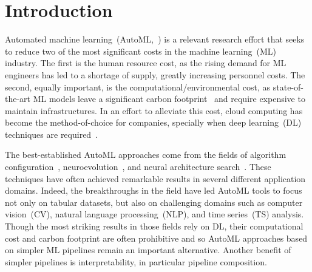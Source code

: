 
\section{Introduction}
\label{sec:intro}

Automated machine learning~(AutoML,~\cite{HutKotVan2019automl}) is a relevant research effort that seeks to reduce two of the most significant costs in the machine learning~(ML) industry. The first is the human resource cost, as the rising demand for ML engineers has led to a shortage of supply, greatly increasing personnel costs. The second, equally important, is the computational/environmental cost, as state-of-the-art ML models leave a significant carbon footprint~\cite{StrGanMcC2019energy} and require expensive to maintain infrastructures. 
In an effort to alleviate this cost, cloud computing has become the method-of-choice for companies, specially when deep learning~(DL) techniques are required~\cite{LeCBenGeo2015dl}. %


The best-established AutoML approaches come from the fields of algorithm configuration~\cite{autoweka,auto-sklearn}, neuroevolution~\cite{StaMii2002neat,google-evonn,LuWhaBodDheDebGooBan2019nsganet}, and neural architecture search~\cite{ElsMetHut2019nas-survey}.
These techniques have often achieved remarkable results in several different application domains.
Indeed, the breakthroughs in the field have led AutoML tools to focus not only on tabular datasets, but also on challenging domains such as computer vision~(CV), natural language processing~(NLP), and time series~(TS) analysis.
Though the most striking results in those fields rely on DL, their computational cost and carbon footprint are often prohibitive and so AutoML approaches based on simpler ML pipelines remain an important alternative. Another benefit of simpler pipelines is interpretability, in particular pipeline composition.%

